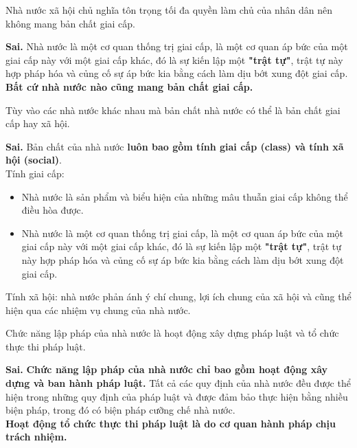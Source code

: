 \begin{ques}
Nhà nước xã hội chủ nghĩa tôn trọng tối đa quyền làm chủ của nhân dân nên không mang bản chất giai cấp.
\end{ques}
\begin{ans}
\textbf{Sai.} Nhà nước là một cơ quan thống trị giai cấp, là một cơ quan áp bức của một giai cấp này với một giai cấp khác, đó là sự kiến lập một \textbf{"trật tự"}, trật tự này hợp pháp hóa và củng cố sự áp bức kia bằng cách làm dịu bớt xung đột giai cấp. \textbf{Bất cứ nhà nước nào cũng mang bản chất giai cấp.}
\end{ans}

\begin{ques}
Tùy vào các nhà nước khác nhau mà bản chất nhà nước có thể là bản chất giai cấp hay xã hội.
\end{ques}
\begin{ans}
\textbf{Sai.} Bản chất của nhà nước \textbf{luôn bao gồm tính giai cấp (class) và tính xã hội (social)}. \\
Tính giai cấp:
\begin{itemize}
\item Nhà nước là sản phẩm và biểu hiện của những mâu thuẫn giai cấp không thể điều hòa được.
\item Nhà nước là một cơ quan thống trị giai cấp, là một cơ quan áp bức của một giai cấp này với một giai cấp khác, đó là sự kiến lập một \textbf{"trật tự"}, trật tự này hợp pháp hóa và củng cố sự áp bức kia bằng cách làm dịu bớt xung đột giai cấp.
\end{itemize}
Tính xã hội: nhà nước phản ánh ý chí chung, lợi ích chung của xã hội và cũng thể hiện qua các nhiệm vụ chung của nhà nước.
\end{ans}

\begin{ques}
Chức năng lập pháp của nhà nước là hoạt động xây dựng pháp luật và tổ chức thực thi pháp luật.
\end{ques}
\begin{ans}
\textbf{Sai.} \textbf{Chức năng lập pháp của nhà nước chỉ bao gồm hoạt động xây dựng và ban hành pháp luật.} Tất cả các quy định của nhà nước đều được thể hiện trong những quy định của pháp luật và được đảm bảo thực hiện bằng nhiều biện pháp, trong đó có biện pháp cưỡng chế nhà nước.\\
\textbf{Hoạt động tổ chức thực thi pháp luật là do cơ quan hành pháp chịu trách nhiệm.}
\end{ans}

